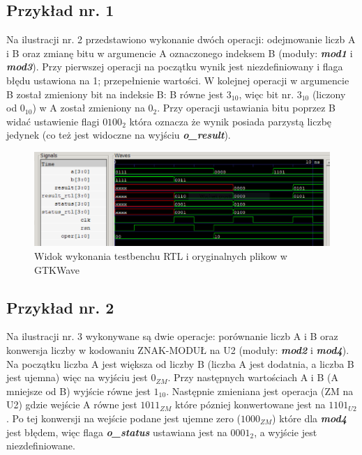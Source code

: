 \subsection{Przykład nr. 1}

\noindent
Na ilustracji nr. 2 przedstawiono wykonanie dwóch operacji: odejmowanie liczb A i B oraz zmianę bitu w argumencie A oznaczonego indeksem B (moduły: \textbf{\emph{mod1}} i \textbf{\emph{mod3}}). Przy pierwszej operacji na początku wynik jest niezdefiniowany i flaga błędu ustawiona na 1; przepełnienie wartości. W kolejnej operacji w argumencie B został zmieniony bit na indeksie B: B równe jest \(3_{10}\), więc bit nr. \(3_{10}\) (liczony od \(0_{10}\)) w A został zmieniony na \(0_2\). Przy operacji ustawiania bitu poprzez B widać ustawienie flagi \(0100_2\) która oznacza że wynik posiada parzystą liczbę jedynek (co też jest widoczne na wyjściu \textbf{\emph{o\_result}}).

\begin{figure}[h!]
	\centering
	\includegraphics[width=1\linewidth]{img1}
	\caption{Widok wykonania testbenchu RTL i oryginalnych plikow w GTKWave}
	\label{fig:img1}
\end{figure}

\subsection{Przykład nr. 2}

\noindent
Na ilustracji nr. 3 wykonywane są dwie operacje: porównanie liczb A i B oraz konwersja liczby w kodowaniu ZNAK-MODUŁ na U2 (moduły: \textbf{\emph{mod2}} i \textbf{\emph{mod4}}). Na początku liczba A jest większa od liczby B (liczba A jest dodatnia, a liczba B jest ujemna) więc na wyjściu jest \(0_{ZM}\). Przy następnych wartościach A i B (A mniejsze od B) wyjście równe jest \(1_{10}\). Następnie zmieniana jest operacja (ZM na U2) gdzie wejście A równe jest \(1011_{ZM}\) które pózniej konwertowane jest na \(1101_{U2}\). Po tej konwersji na wejście podane jest ujemne zero (\(1000_{ZM}\)) które dla \textbf{\emph{mod4}} jest błędem, więc flaga \textbf{\emph{o\_status}} ustawiana jest na \(0001_{2}\), a wyjście jest niezdefiniowane.

